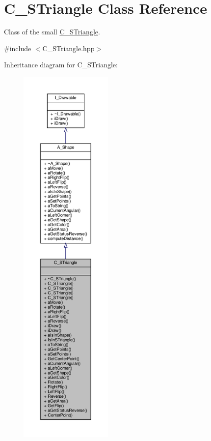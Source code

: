 \hypertarget{classC__STriangle}{}\section{C\+\_\+\+S\+Triangle Class Reference}
\label{classC__STriangle}


Class of the small \hyperlink{classC__STriangle}{C\+\_\+\+S\+Triangle}.  




{\ttfamily \#include $<$C\+\_\+\+S\+Triangle.\+hpp$>$}



Inheritance diagram for C\+\_\+\+S\+Triangle\+:\nopagebreak
\begin{figure}[H]
\begin{center}
\leavevmode
\includegraphics[height=550pt]{classC__STriangle__inherit__graph}
\end{center}
\end{figure}


